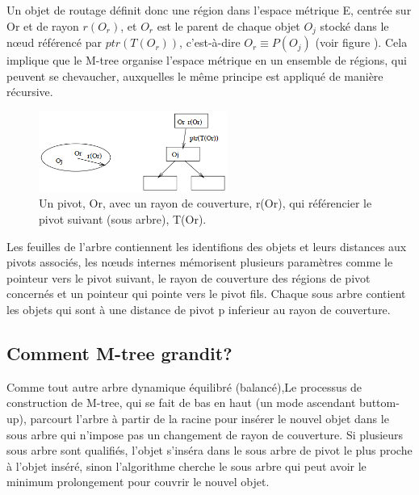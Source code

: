 Un objet de routage définit donc une région dans l'espace métrique E, centrée sur Or et de rayon $ r(O_r) $, et $ O_r $ est le parent de chaque objet $ O_j $ stocké dans le nœud référencé par $ ptr(T(O_r)) $, c'est-à-dire $ O_r \equiv P(O_j)$ (voir figure ).  Cela implique que le M-tree organise l'espace métrique en un ensemble de régions, qui peuvent se chevaucher, auxquelles le même principe est appliqué de manière récursive.

\begin{figure}[H]
	\centering
	\includegraphics[width=0.55\textwidth]{Figures/mtree.png} %
	\caption{ Un pivot, Or, avec un rayon de couverture, r(Or), qui référencier le pivot suivant (sous arbre), T(Or).}
\end{figure}


Les feuilles de l’arbre contiennent les identifions des objets et leurs distances aux pivots associés, les nœuds internes mémorisent plusieurs paramètres comme le pointeur vers le pivot suivant, le rayon de couverture des régions de pivot concernés et un pointeur qui pointe vers le pivot fils. Chaque sous arbre contient les objets qui sont à une distance de pivot p inferieur au rayon de couverture.\\

\subsection{Comment M-tree grandit?}



Comme tout autre arbre dynamique équilibré (balancé),Le processus de construction de M-tree, qui se fait de bas en haut (un mode ascendant buttom-up), parcourt l'arbre à partir de la racine pour insérer le nouvel objet dans le sous arbre qui n'impose pas un changement de rayon de couverture. Si plusieurs sous arbre sont qualifiés, l'objet s'inséra dans le sous arbre de pivot le plus proche à l'objet inséré, sinon l'algorithme cherche le sous arbre qui peut avoir le minimum prolongement pour couvrir le nouvel objet.\\

